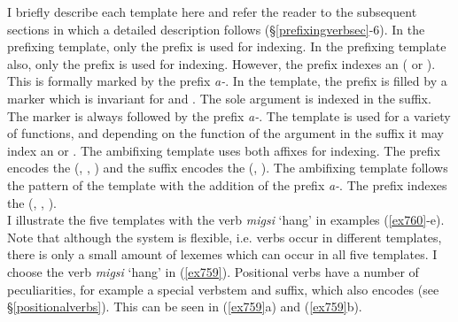 I briefly describe each template here and refer the reader to the subsequent sections in which a detailed description follows (\S{}\ref{prefixingverbsec}-6). In the prefixing template, only the  prefix is used for  indexing. In the  prefixing template also, only the  prefix is used for  indexing. However, the  prefix indexes an  ( or ). This is formally marked by the  prefix \emph{a-}. In the  template, the prefix is filled by a  marker which is invariant for  and . The sole argument is indexed in the suffix. The  marker is always followed by the  prefix \emph{a-}. The  template is used for a variety of functions, and depending on the function of the argument in the suffix it may index an  or . The ambifixing  template uses both affixes for  indexing. The prefix encodes the  (, , ) and the suffix encodes the  (, ). The  ambifixing template follows the pattern of the  template with the addition of the  prefix \emph{a-}. The  prefix indexes the  (, , ).\\

I illustrate the five templates with the verb \emph{migsi} `hang' in examples (\ref{ex760}-e). Note that although the system is flexible, i.e. verbs occur in different templates, there is only a small amount of  lexemes which can occur in all five templates. I choose the  verb \emph{migsi} `hang' in (\ref{ex759}). Positional verbs have a number of peculiarities, for example a special verbstem and  suffix, which also encodes  (see \S\ref{positionalverbs}). This can be seen in (\ref{ex759}a) and  (\ref{ex759}b).

